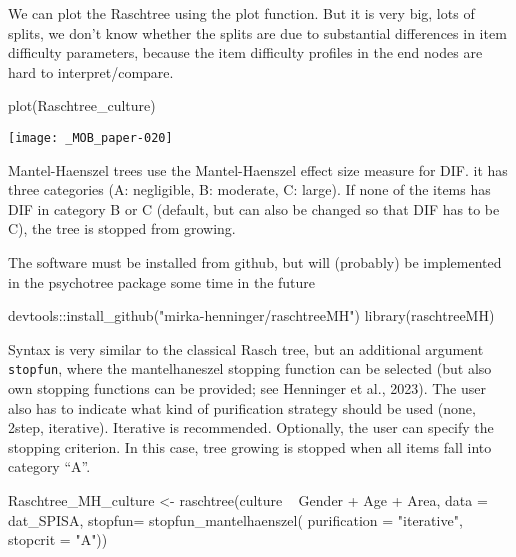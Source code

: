 \documentclass[doc,floatsintext,natbib]{apa7}
\begin{document}
We can plot the Raschtree using the plot function. But it is very big, lots of splits, we don't know whether the splits are due to substantial differences in item difficulty parameters, because the item difficulty profiles in the end nodes are hard to interpret/compare. 

\begin{Schunk}
\begin{Sinput}
 plot(Raschtree_culture)
\end{Sinput}
\end{Schunk}
\texttt{[image: \_MOB\_paper-020]}


Mantel-Haenszel trees use the Mantel-Haenszel effect size measure for DIF. it has three categories (A: negligible, B: moderate, C: large). If none of the items has DIF in category B or C (default, but can also be changed so that DIF has to be C), the tree is stopped from growing. 

The software must be installed from github, but will (probably) be implemented in the psychotree package some time in the future

\begin{Schunk}
\begin{Sinput}
 devtools::install_github("mirka-henninger/raschtreeMH")
 library(raschtreeMH)
\end{Sinput}
\end{Schunk}

Syntax is very similar to the classical Rasch tree, but an additional argument \texttt{stopfun}, where the mantelhaneszel stopping function can be selected (but also own stopping functions can be provided; see Henninger et al., 2023). The user also has to indicate what kind of purification strategy should be used (none, 2step, iterative). Iterative is recommended. Optionally, the user can specify the stopping criterion. In this case, tree growing is stopped when all items fall into category ``A''. 


\begin{Schunk}
\begin{Sinput}
 Raschtree_MH_culture <- raschtree(culture ~  Gender + Age + Area, 
                                   data = dat_SPISA, 
                                   stopfun= stopfun_mantelhaenszel(
                                     purification = "iterative",
                                     stopcrit = "A"))
\end{Sinput}
\end{Schunk}
\end{document}
